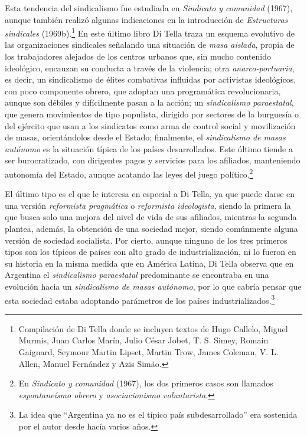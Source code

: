 Esta tendencia del sindicalismo fue estudiada en \emph{Sindicato y comunidad} (1967), aunque también realizó algunas indicaciones en la introducción de \emph{Estructuras sindicales} (1969b).\footnote{Compilación de Di Tella donde se incluyen textos de Hugo Callelo, Miguel Murmis, Juan Carlos Marín, Julio César Jobet, T. S. Simey, Romain Gaignard, Seymour Martin Lipset, Martin Trow, James Coleman, V. L. Allen, Manuel Fernández y Azis Simão.} En este último libro Di Tella traza un esquema evolutivo de las organizaciones sindicales señalando una situación de \emph{masa aislada}, propia de los trabajadores alejados de los centros urbanos que, sin mucho contenido ideológico, encauzan su conducta a través de la violencia; otra \emph{anarco-portuaria}, es decir, un sindicalismo de élites combativas influidas por activistas ideológicos, con poco componente obrero, que adoptan una programática revolucionaria, aunque son débiles y difícilmente pasan a la acción; un \emph{sindicalismo paraestatal}, que genera movimientos de tipo populista, dirigido por sectores de la burguesía o del ejército que usan a los sindicatos como arma de control social y movilización de masas, orientándolos desde el Estado; finalmente, el \emph{sindicalismo de masas autónomo} es la situación típica de los países desarrollados. Este último tiende a ser burocratizado, con dirigentes pagos y servicios para los afiliados, manteniendo autonomía del Estado, aunque acatando las leyes del juego político.\footnote{En \emph{Sindicato y comunidad} (1967), los dos primeros casos son llamados \emph{espontaneísmo obrero} y \emph{asociacionismo voluntarista}.}

El último tipo es el que le interesa en especial a Di Tella, ya que puede darse en una versión \emph{reformista pragmática} o \emph{reformista ideologista}, siendo la primera la que busca solo una mejora del nivel de vida de sus afiliados, mientras la segunda plantea, además, la obtención de una sociedad mejor, siendo comúnmente alguna versión de sociedad socialista. Por cierto, aunque ninguno de los tres primeros tipos son los típicos de países con alto grado de industrialización, ni lo fueron en su historia en la misma medida que en América Latina, Di Tella observa que en Argentina el \emph{sindicalismo paraestatal} predominante se encontraba en una evolución hacia un \emph{sindicalismo de masas autónomo}, por lo que cabría pensar que esta sociedad estaba adoptando parámetros de los países industrializados.\footnote{La idea que \enquote{Argentina ya no es el típico país subdesarrollado} \parencite[45]{1660-DITELLA1962} era sostenida por el autor desde hacía varios años.}

